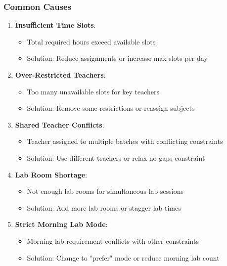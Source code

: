 \documentclass[12pt,a4paper]{article}
\begin{document}
\subsubsection{Common Causes}
\begin{enumerate}
    \item \textbf{Insufficient Time Slots}:
    \begin{itemize}
        \item Total required hours exceed available slots
        \item Solution: Reduce assignments or increase max slots per day
    \end{itemize}
    
    \item \textbf{Over-Restricted Teachers}:
    \begin{itemize}
        \item Too many unavailable slots for key teachers
        \item Solution: Remove some restrictions or reassign subjects
    \end{itemize}
    
    \item \textbf{Shared Teacher Conflicts}:
    \begin{itemize}
        \item Teacher assigned to multiple batches with conflicting constraints
        \item Solution: Use different teachers or relax no-gaps constraint
    \end{itemize}
    
    \item \textbf{Lab Room Shortage}:
    \begin{itemize}
        \item Not enough lab rooms for simultaneous lab sessions
        \item Solution: Add more lab rooms or stagger lab times
    \end{itemize}
    
    \item \textbf{Strict Morning Lab Mode}:
    \begin{itemize}
        \item Morning lab requirement conflicts with other constraints
        \item Solution: Change to "prefer" mode or reduce morning lab count
    \end{itemize}
\end{enumerate}
\end{document}
